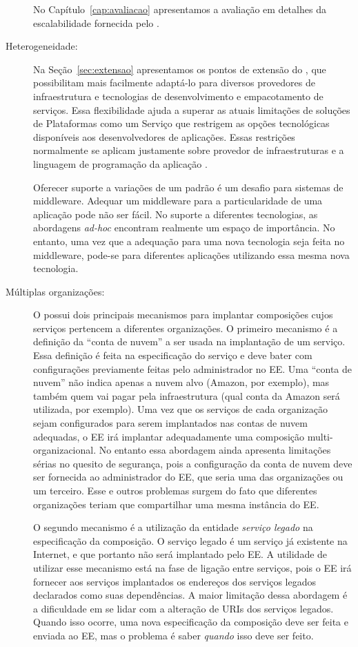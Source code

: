 \begin{description}
No Capítulo~\ref{cap:avaliacao} apresentamos a avaliação em detalhes da 
escalabilidade fornecida pelo \ee.

\item [Heterogeneidade:]

Na Seção~\ref{sec:extensao} apresentamos os pontos de extensão do \ee,
que possibilitam mais facilmente adaptá-lo para diversos provedores de infraestrutura
e tecnologias de desenvolvimento e empacotamento de serviços.
Essa flexibilidade ajuda a superar
as atuais limitações de soluções de Plataformas como um Serviço
que restrigem as opções tecnológicas disponíveis aos desenvolvedores de aplicações.
Essas restrições normalmente se aplicam justamente sobre
provedor de infraestruturas e a linguagem de programação da aplicação .

Oferecer suporte a variações de um padrão é um desafio para sistemas de middleware.
Adequar um middleware para a particularidade de uma aplicação pode não ser fácil.
No suporte a diferentes tecnologias, as abordagens \emph{ad-hoc} encontram realmente um espaço de importância.
No entanto, uma vez que a adequação para uma nova tecnologia seja feita no middleware,
pode-se  para diferentes aplicações utilizando essa
mesma nova tecnologia.

\item [Múltiplas organizações:]

O \ee possui dois principais mecanismos para implantar composições cujos serviços
pertencem a diferentes organizações.
O primeiro mecanismo é a definição da ``conta de nuvem'' a ser usada na implantação de um serviço.
Essa definição é feita na especificação do serviço e deve bater com configurações
previamente feitas pelo administrador no EE.
Uma ``conta de nuvem'' não indica apenas a nuvem alvo (Amazon, por exemplo),
mas também quem vai pagar pela infraestrutura (qual conta da Amazon será utilizada, por exemplo).
Uma vez que os serviços de cada organização sejam configurados para serem implantados
nas contas de nuvem adequadas, o EE irá implantar adequadamente uma composição
multi-organizacional.
No entanto essa abordagem ainda apresenta limitações sérias no quesito de segurança,
pois a configuração da conta de nuvem deve ser fornecida ao administrador do EE,
que seria uma das organizações ou um terceiro.
Esse e outros problemas surgem do fato que diferentes organizações teriam que
compartilhar uma mesma instância do EE.

O segundo mecanismo é a utilização da entidade \emph{serviço legado} na especificação da composição.
O serviço legado é um serviço já existente na Internet, e que portanto
não será implantado pelo EE.
A utilidade de utilizar esse mecanismo está na fase de ligação
entre serviços, pois o EE irá fornecer
aos serviços implantados os endereços dos serviços legados declarados como suas dependências.
A maior limitação dessa abordagem é a dificuldade em se lidar com a alteração de URIs
dos serviços legados.
Quando isso ocorre, uma nova especificação da composição deve ser feita e enviada ao EE,
mas o problema é saber \emph{quando} isso deve ser feito.


\end{description}
